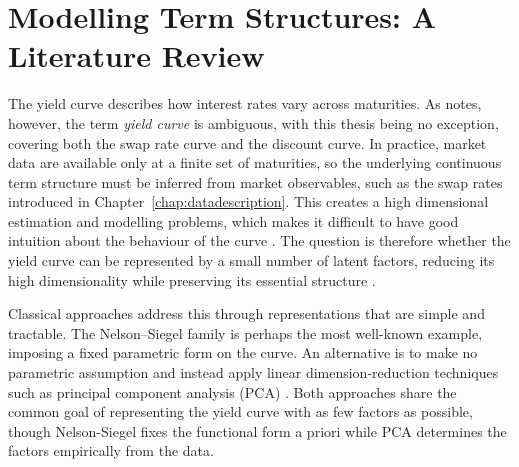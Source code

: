 \chapter{Modelling Term Structures: A Literature Review}
\label{ch:model-background}

The yield curve describes how interest rates vary across maturities. As \citet{Filipovic2009} notes, however, the term \textit{yield curve} is ambiguous, with this thesis being no exception, covering both the swap rate curve and the discount curve. In practice, market data are available only at a finite set of maturities, so the underlying continuous term structure must be inferred from market observables, such as the swap rates introduced in Chapter~\ref{chap:datadescription}. This creates a high dimensional estimation and modelling problems, which makes it difficult to have good intuition about the behaviour of the curve \citep{Filipovic2009}. The question is therefore whether the yield curve can be represented by a small number of latent factors, reducing its high dimensionality while preserving its essential structure \citep{Skovmand2025tsm}.





Classical approaches address this through representations that are simple and tractable. The Nelson--Siegel family \citep{NelsonSiegel1987} is perhaps the most well-known example, imposing a fixed parametric form on the curve. An alternative is to make no parametric assumption and instead apply linear dimension-reduction techniques such as principal component analysis (PCA) \citep{Skovmand2025tsm}. Both approaches share the common goal of representing the yield curve with as few factors as possible, though Nelson-Siegel fixes the functional form a priori while PCA determines the factors empirically from the data.

